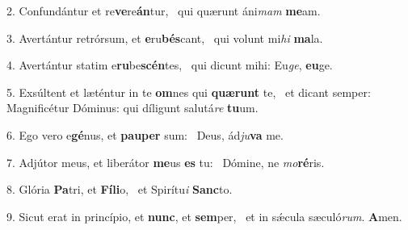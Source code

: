 2. Confundántur et re\textbf{ve}re\textbf{án}tur, \ast\  qui quærunt áni\textit{mam} \textbf{me}am.\

3. Avertántur retrórsum, et \textbf{e}ru\textbf{bés}cant, \ast\  qui volunt mi\textit{hi} \textbf{ma}la.\

4. Avertántur statim e\textbf{ru}be\textbf{scén}tes, \ast\  qui dicunt mihi: Eu\textit{ge}, \textbf{eu}ge.\

5. Exsúltent et læténtur in te \textbf{om}nes qui \textbf{quæ}\textbf{runt} te, \ast\  et dicant semper: Magnificétur Dóminus: qui díligunt salutá\textit{re} \textbf{tu}um.\

6. Ego vero e\textbf{gé}nus, et \textbf{pau}\textbf{per} sum: \ast\  Deus, ád\textit{ju}\textbf{va} me.\

7. Adjútor meus, et liberátor \textbf{me}us \textbf{es} tu: \ast\  Dómine, ne \textit{mo}\textbf{ré}ris.\

8. Glória \textbf{Pa}tri, et \textbf{Fí}\textbf{li}o, \ast\  et Spirítu\textit{i} \textbf{Sanc}to.\

9. Sicut erat in princípio, et \textbf{nunc}, et \textbf{sem}per, \ast\  et in sǽcula sæculó\textit{rum}. \textbf{A}men.\

